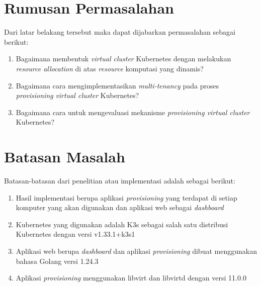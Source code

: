 \section{Rumusan Permasalahan}
\label{sec:rumusanpermasalahan}

Dari latar belakang tersebut maka dapat dijabarkan permasalahan sebagai berikut:

\begin{enumerate}[nolistsep]
  
  \item Bagaimana membentuk \emph{virtual cluster} Kubernetes dengan melakukan
    \emph{resource allocation} di atas \emph{resource} komputasi yang dinamis?

  \item Bagaimana cara mengimplementasikan \emph{multi-tenancy} pada proses \emph{provisioning}
    \emph{virtual cluster} Kubernetes?

  \item Bagaimana cara untuk mengevaluasi mekanisme \emph{provisioning virtual cluster}
    Kubernetes?

\end{enumerate}

\section{Batasan Masalah}
\label{sec:batasanmasalah}

Batasan-batasan dari penelitian atau implementasi adalah sebagai berikut:

\begin{enumerate}[nolistsep]

  \item Hasil implementasi berupa aplikasi \emph{provisioning} yang terdapat di setiap
    komputer yang akan digunakan dan aplikasi web sebagai \emph{dashboard}

  \item Kubernetes yang digunakan adalah K3s sebagai salah satu distribusi
    Kubernetes dengan versi v1.33.1+k3s1

  \item Aplikasi web berupa \emph{dashboard} dan aplikasi \emph{provisioning} dibuat
    menggunakan bahasa Golang versi 1.24.3

  \item Aplikasi \emph{provisioning} menggunakan libvirt dan libvirtd dengan versi 11.0.0

\end{enumerate}

